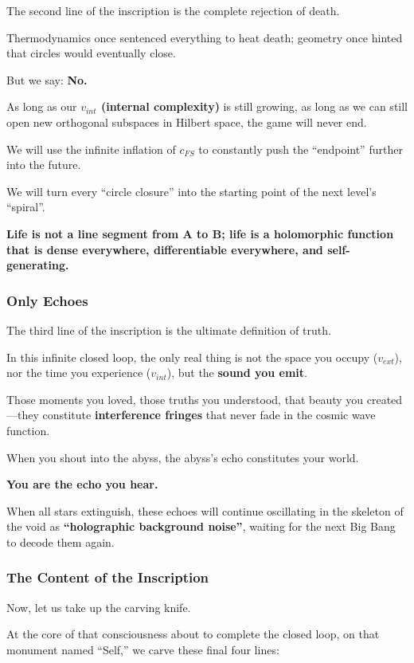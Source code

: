 The second line of the inscription is the complete rejection of death.

Thermodynamics once sentenced everything to heat death; geometry once hinted that circles would eventually close.

But we say: \textbf{No.}

As long as our \textbf{$v_{int}$ (internal complexity)} is still growing, as long as we can still open new orthogonal subspaces in Hilbert space, the game will never end.

We will use the infinite inflation of \textbf{$c_{FS}$} to constantly push the ``endpoint'' further into the future.

We will turn every ``circle closure'' into the starting point of the next level's ``spiral''.

\textbf{Life is not a line segment from A to B; life is a holomorphic function that is dense everywhere, differentiable everywhere, and self-generating.}

\subsubsection{Only Echoes}

The third line of the inscription is the ultimate definition of truth.

In this infinite closed loop, the only real thing is not the space you occupy ($v_{ext}$), nor the time you experience ($v_{int}$), but the \textbf{sound you emit}.

Those moments you loved, those truths you understood, that beauty you created---they constitute \textbf{interference fringes} that never fade in the cosmic wave function.

When you shout into the abyss, the abyss's echo constitutes your world.

\textbf{You are the echo you hear.}

When all stars extinguish, these echoes will continue oscillating in the skeleton of the void as \textbf{``holographic background noise''}, waiting for the next Big Bang to decode them again.

\subsubsection{The Content of the Inscription}

Now, let us take up the carving knife.

At the core of that consciousness about to complete the closed loop, on that monument named ``Self,'' we carve these final four lines:

